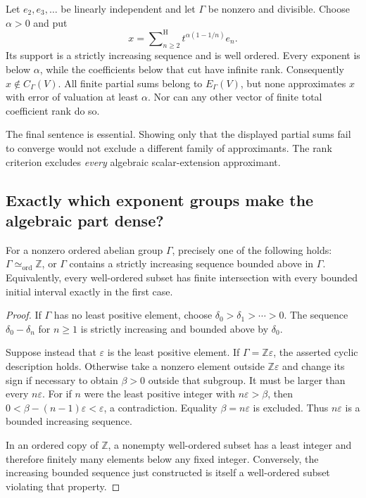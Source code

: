 \documentclass[11pt,letterpaper]{article}
\numberwithin{equation}{section}
\theoremstyle{definition}
\theoremstyle{remark}
\newcommand{\Z}{\mathbb Z}
\newcommand{\sH}{\mathop{\sum}\nolimits^{\mathrm H}}
\begin{document}
\begin{example}
\label{duals:ex:bounded-support}
Let $e_2,e_3,\ldots$ be linearly independent and let $\Gamma$ be nonzero
and divisible. Choose $\alpha>0$ and put
\begin{equation}\label{duals:eq:bounded-example}
 x=\sH_{n\ge2}t^{\alpha(1-1/n)}e_n.
\end{equation}
Its support is a strictly increasing sequence and is well ordered.
Every exponent is below $\alpha$, while the coefficients below that
cut have infinite rank. Consequently $x\notin C_\Gamma(V)$.
All finite partial sums belong to $E_\Gamma(V)$, but none approximates
$x$ with error of valuation at least $\alpha$. Nor can any other vector
of finite total coefficient rank do so.
\end{example}

The final sentence is essential. Showing only that the displayed
partial sums fail to converge would not exclude a different family of
approximants. The rank criterion excludes \emph{every} algebraic
scalar-extension approximant.

\subsection{Exactly which exponent groups make the algebraic part dense?}
\begin{lemma}\label{duals:lem:group}
For a nonzero ordered abelian group $\Gamma$, precisely one of the
following holds: $\Gamma\simeq_{\mathrm{ord}}\Z$, or $\Gamma$ contains
a strictly increasing sequence bounded above in $\Gamma$.
Equivalently, every well-ordered subset has finite intersection with
every bounded initial interval exactly in the first case.
\end{lemma}
\begin{proof}
If $\Gamma$ has no least positive element, choose
$\delta_0>\delta_1>\cdots>0$. The sequence
$\delta_0-\delta_n$ for $n\ge1$ is strictly increasing and bounded
above by $\delta_0$.

Suppose instead that $\varepsilon$ is the least positive element.
If $\Gamma=\Z\varepsilon$, the asserted cyclic description holds.
Otherwise take a nonzero element outside $\Z\varepsilon$ and change
its sign if necessary to obtain $\beta>0$ outside that subgroup.
It must be larger
than every $n\varepsilon$. For if $n$ were the least positive integer
with $n\varepsilon>\beta$, then
$0<\beta-(n-1)\varepsilon<\varepsilon$, a contradiction.
Equality $\beta=n\varepsilon$ is excluded. Thus $n\varepsilon$ is a
bounded increasing sequence.

In an ordered copy of $\Z$, a nonempty well-ordered subset has a least
integer and therefore finitely many elements below any fixed integer.
Conversely, the increasing bounded sequence just constructed is itself
a well-ordered subset violating that property.
\end{proof}
\end{document}
